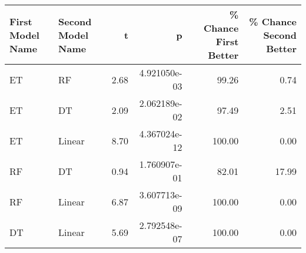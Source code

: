 \begin{tabular}{llrrrr}
\toprule
First Model Name & Second Model Name &    t &            p &  \% Chance First Better &  \% Chance Second Better \\
\midrule
              ET &                RF & 2.68 & 4.921050e-03 &                  99.26 &                    0.74 \\
              ET &                DT & 2.09 & 2.062189e-02 &                  97.49 &                    2.51 \\
              ET &            Linear & 8.70 & 4.367024e-12 &                 100.00 &                    0.00 \\
              RF &                DT & 0.94 & 1.760907e-01 &                  82.01 &                   17.99 \\
              RF &            Linear & 6.87 & 3.607713e-09 &                 100.00 &                    0.00 \\
              DT &            Linear & 5.69 & 2.792548e-07 &                 100.00 &                    0.00 \\
\bottomrule
\end{tabular}
